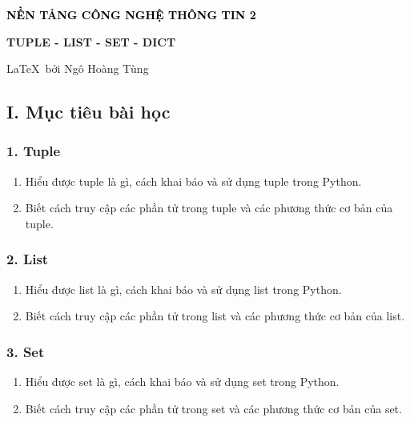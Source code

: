 
\begin{center}
    \textbf{\textcolor{black}{\large\LARGE NỀN TẢNG CÔNG NGHỆ THÔNG TIN 2}}

    \textbf{\large TUPLE - LIST - SET - DICT}

    \large\LaTeX\, bởi Ngô Hoàng Tùng
\end{center}


\subsection*{I. Mục tiêu bài học}
\subsubsection*{1. Tuple}
\begin{enumerate}[label=\alph*.]
    \item Hiểu được tuple là gì, cách khai báo và sử dụng tuple trong Python.
    \item Biết cách truy cập các phần tử trong tuple và các phương thức cơ bản của tuple.
\end{enumerate}
\subsubsection*{2. List}
\begin{enumerate}[label=\alph*.]
    \item Hiểu được list là gì, cách khai báo và sử dụng list trong Python.
    \item Biết cách truy cập các phần tử trong list và các phương thức cơ bản của list.
\end{enumerate}
\subsubsection*{3. Set}
\begin{enumerate}[label=\alph*.]
    \item Hiểu được set là gì, cách khai báo và sử dụng set trong Python.
    \item Biết cách truy cập các phần tử trong set và các phương thức cơ bản của set.
\end{enumerate}
